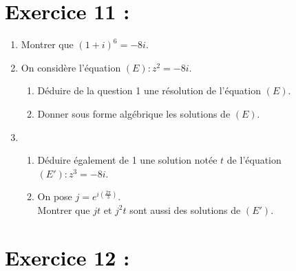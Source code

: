\documentclass[12pt]{article}
\begin{document}
\section*{\textcolor{black}{Exercice 11 :}}

\begin{enumerate}
    \item Montrer que $(1 + i)^6 = -8i$.

    \item On considère l'équation $(E) : z^2 = -8i$.
    \begin{enumerate}
        \item Déduire de la question 1 une résolution de l'équation $(E)$.
        \item Donner sous forme algébrique les solutions de $(E)$.
    \end{enumerate}

    \item
    \begin{enumerate}
        \item Déduire également de 1 une solution notée $t$ de l'équation $(E') : z^3 = -8i$.
        \item On pose $j = e^{i\left(\frac{2\pi}{3}\right)}$. \\ 
        Montrer que $jt$ et $j^2t$ sont aussi des solutions de $(E')$.
    \end{enumerate}
\end{enumerate}
\section*{\textcolor{black}{Exercice 12 :}}
\end{document}
